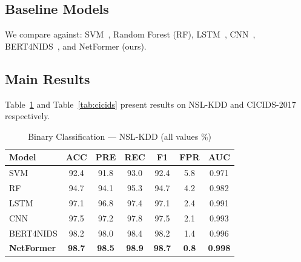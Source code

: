 \documentclass[conference]{IEEEtran}
\begin{document}
\subsection{Baseline Models}

We compare against:
SVM~\cite{ref:tsai2009}, Random Forest (RF),
LSTM~\cite{ref:kim2016}, CNN~\cite{ref:wang2017},
BERT4NIDS~\cite{ref:xu2021}, and NetFormer (ours).

\subsection{Main Results}

Table~\ref{tab:nslkdd} and Table~\ref{tab:cicids} present results
on NSL-KDD and CICIDS-2017 respectively.

\begin{table}[h]
	\caption{Binary Classification --- NSL-KDD (all values \%)}
	\label{tab:nslkdd}
	\centering
	\renewcommand{\arraystretch}{1.15}
	\begin{tabular}{@{}lcccccc@{}}
		\toprule
		\textbf{Model}     & \textbf{ACC}   & \textbf{PRE}  & \textbf{REC}
		                   & \textbf{F1}    & \textbf{FPR}  & \textbf{AUC}                      \\
		\midrule
		SVM                & 92.4           & 91.8          & 93.0         & 92.4 & 5.8 & 0.971 \\
		RF                 & 94.7           & 94.1          & 95.3         & 94.7 & 4.2 & 0.982 \\
		LSTM               & 97.1           & 96.8          & 97.4         & 97.1 & 2.4 & 0.991 \\
		CNN                & 97.5           & 97.2          & 97.8         & 97.5 & 2.1 & 0.993 \\
		BERT4NIDS          & 98.2           & 98.0          & 98.4         & 98.2 & 1.4 & 0.996 \\
		\midrule
		\textbf{NetFormer} & \textbf{98.7}  & \textbf{98.5}
		                   & \textbf{98.9}  & \textbf{98.7} & \textbf{0.8}
		                   & \textbf{0.998}                                                     \\
		\bottomrule
	\end{tabular}
\end{table}
\end{document}
